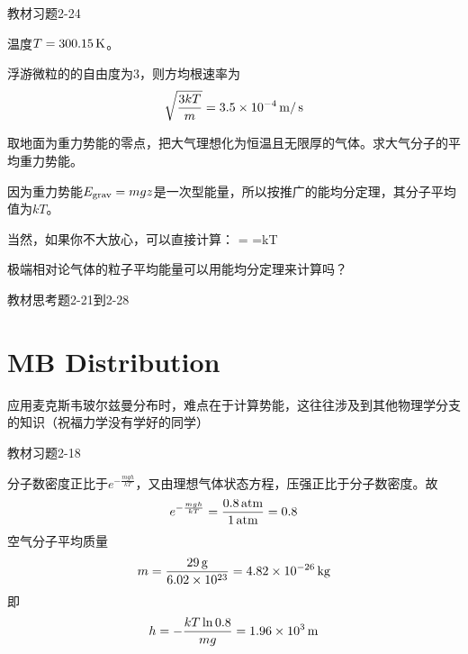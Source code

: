 \documentclass[CJK]{beamer}
\begin{document}
\begin{frame}
\bch
{\blue 教材习题2-24}

\skipline

{\small
温度$T = 300.15\,\mathrm{K}$。

浮游微粒的的自由度为3，则方均根速率为
$$\sqrt{\frac{3kT}{m}} = 3.5\times 10^{-4} \,\mathrm{m}/\,\mathrm{s}$$  
}

\ech
\end{frame}


\begin{frame}
\bch
{\blue 取地面为重力势能的零点，把大气理想化为恒温且无限厚的气体。求大气分子的平均重力势能。}

{\small
因为重力势能$E_{\rm grav} = mgz$是一次型能量，所以按推广的能均分定理，其分子平均值为$kT$。

\skipline

当然，如果你不大放心，可以直接计算：
\be
{} =  =kT
\ee

}

\ech
\end{frame}


\begin{frame}
\bch


极端相对论气体的粒子平均能量可以用能均分定理来计算吗？

\ech
\end{frame}


\begin{frame}
\bch
{\blue 教材思考题2-21到2-28}
\ech
\end{frame}

\section{MB Distribution}

\begin{frame}
\bch
应用麦克斯韦玻尔兹曼分布时，难点在于计算势能，这往往涉及到其他物理学分支的知识（\bye 祝福力学没有学好的同学）
\ech
\end{frame}

\begin{frame}
\bch
{\blue 教材习题2-18}

\skipline

{\scriptsize
分子数密度正比于$e^{-\frac{mgh}{kT}}$，又由理想气体状态方程，压强正比于分子数密度。故
$$ e^{-\frac{mgh}{kT}} = \frac{0.8\,\mathrm{atm}}{1\,\mathrm{atm}} = 0.8$$
空气分子平均质量
$$m = \frac{29\,\mathrm{g}}{6.02\times 10^{23}} = 4.82\times 10^{-26}\,\mathrm{kg}$$
即
$$h = -\frac{kT\ln 0.8}{mg} = 1.96\times 10^3 \,\mathrm{m}$$ 
}
\ech
\end{frame}
\end{document}
